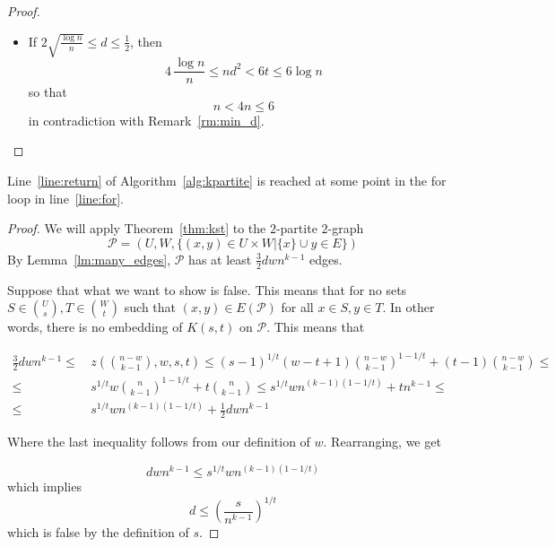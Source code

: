 \begin{lemma}
\begin{proof}
\begin{itemize}
            \item If $2 \sqrt{\frac{\log n}{n}} \leq d \leq \frac{1}{2}$, then
            \[
                4 \, \frac{\log n}{n} \leq nd^2 < 6t \leq 6 \log n
            \]
            so that
            \[
                n < 4 n \leq 6
            \]
            in contradiction with Remark~\ref{rm:min_d}. \qedhere
        \end{itemize}
    \end{proof}
\end{lemma}

\begin{lemma}\label{lm:return}
    Line~\ref{line:return} of Algorithm~\ref{alg:kpartite} is reached at some point in the for
    loop in line~\ref{line:for}.
    \begin{proof}
        We will apply Theorem~\ref{thm:kst} to the $2$-partite $2$-graph
        \[
            \mathcal{P} = (U, W, \{(x, y) \in U \times W | \{x\} \cup y \in E \})
        \]
        By Lemma~\ref{lm:many_edges}, $\mathcal{P}$ has at least
        $\frac{3}{2}dwn^{k-1}$ edges.

        Suppose that what we want to show is false.
        This means that for no sets $S \in \binom{U}{s}, T \in \binom{W}{t}$
        such that $(x, y) \in E (\mathcal{P})$ for all $x \in S, y \in T $.
        In other words, there is no embedding of $K(s, t)$ on $\mathcal{P}$.
        This means that


        \begin{align*}
            \frac{3}{2}dwn^{k-1} \leq &
            \, z \left(\binom{n - w}{k-1}, w, s, t  \right) \leq
            (s-1)^{1/t}(w-t+1)\binom{n-w}{k-1}^{1-1/t} + (t-1)\binom{n-w}{k-1} \leq \\
            \leq & \, s^{1/t} w \binom{n}{k-1}^{1-1/t} + t \binom{n}{k-1} \leq
             s^{1/t} wn^{(k-1)(1-1/t)} + tn^{k-1} \leq \\
            \leq & \, s^{1/t} wn^{(k-1)(1-1/t)} + \frac{1}{2} dwn^{k-1}
        \end{align*}

        Where the last inequality follows from our definition of $w$.
        Rearranging, we get

        \[
            dwn^{k-1} \leq s^{1/t} wn^{(k-1)(1-1/t)}
        \]
        which implies
        \[
            d \leq \left(\frac{s}{n^{k-1}}\right)^{1/t}
        \]
        which is false by the definition of $s$.
    \end{proof}
\end{lemma}

